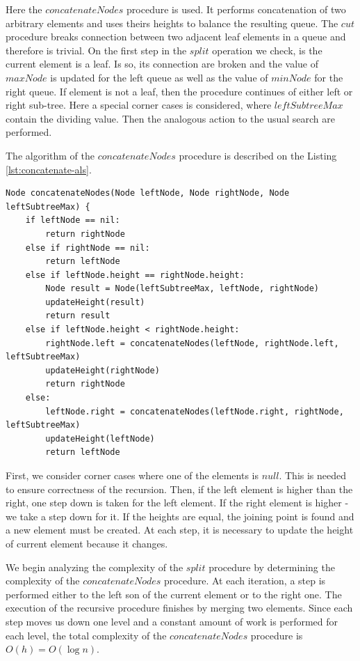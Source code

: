 \documentclass[a4paper,UKenglish,cleveref, autoref]{socg-lipics-v2019}
\begin{document}
	Here the $concatenateNodes$ procedure is used. It performs concatenation of two arbitrary elements and uses theirs heights to balance the resulting queue. The $cut$ procedure breaks connection between two adjacent leaf elements in a queue and therefore is trivial. On the first step in the $split$ operation we check, is the current element is a leaf. Is so, its connection are broken and the value of $maxNode$ is updated for the left queue as well as the value of $minNode$ for the right queue. If element is not a leaf, then the procedure continues of either left or right sub-tree. Here a special corner cases is considered, where $leftSubtreeMax$ contain the dividing value. Then the analogous action to the usual search are performed.
	
	The algorithm of the $concatenateNodes$ procedure is described on the Listing \ref{lst:concatenate-als}.
	
	\begin{lstlisting}[caption={Merging two queues},label={lst:concatenate-als},captionpos=b]
Node concatenateNodes(Node leftNode, Node rightNode, Node leftSubtreeMax) {
    if leftNode == nil:
        return rightNode
    else if rightNode == nil:
        return leftNode
    else if leftNode.height == rightNode.height:
        Node result = Node(leftSubtreeMax, leftNode, rightNode)
        updateHeight(result)
        return result
    else if leftNode.height < rightNode.height:
        rightNode.left = concatenateNodes(leftNode, rightNode.left, leftSubtreeMax)
        updateHeight(rightNode)
        return rightNode
    else:
        leftNode.right = concatenateNodes(leftNode.right, rightNode, leftSubtreeMax)
        updateHeight(leftNode)
        return leftNode
	\end{lstlisting}
	
	First, we consider corner cases where one of the elements is $null$. This is needed to ensure correctness of the recursion. Then, if the left element is higher than the right, one step down is taken for the left element. If the right element is higher - we take a step down for it. If the heights are equal, the joining point is found and a new element must be created. At each step, it is necessary to update the height of current element because it changes.
	
	We begin analyzing the complexity of the $split$ procedure by determining the complexity of the $concatenateNodes$ procedure. At each iteration, a step is performed either to the left son of the current element or to the right one. The execution of the recursive procedure finishes by merging two elements. Since each step moves us down one level and a constant amount of work is performed for each level, the total complexity of the $concatenateNodes$ procedure is $O(h)=O(\log n)$.
	
\end{document}
